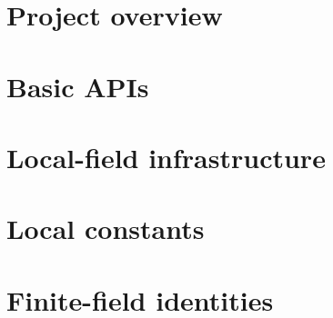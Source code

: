 \chapter{Project overview}


\chapter{Basic APIs}








\chapter{Local-field infrastructure}









\chapter{Local constants}










\chapter{Finite-field identities}














